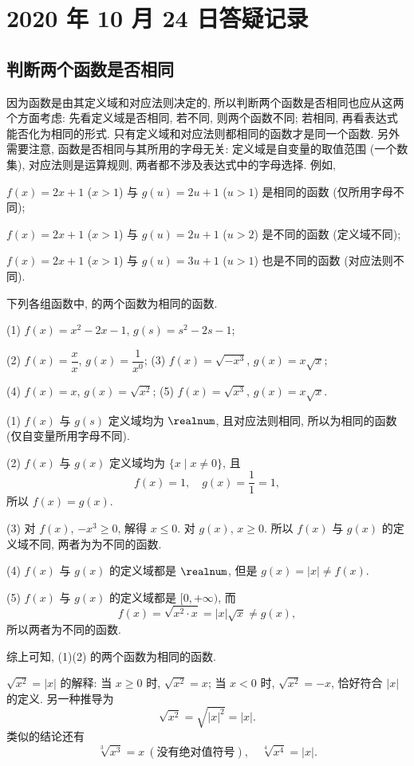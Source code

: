 \section{2020 年 10 月 24 日答疑记录}

\subsection{判断两个函数是否相同}

因为函数是由其定义域和对应法则决定的, 所以判断两个函数是否相同也应从这两个方面考虑: 先看定义域是否相同, 若不同, 则两个函数不同; 若相同, 再看表达式能否化为相同的形式. 只有定义域和对应法则都相同的函数才是同一个函数. 另外需要注意, 函数是否相同与其所用的字母无关: 定义域是自变量的取值范围 (一个数集), 对应法则是运算规则, 两者都不涉及表达式中的字母选择. 例如, 

$f(x)=2x+1$ ($x>1$) 与 $g(u)=2u+1$ ($u>1$) 是相同的函数 (仅所用字母不同); 

$f(x)=2x+1$ ($x>1$) 与 $g(u)=2u+1$ ($u>2$) 是不同的函数 (定义域不同);

 $f(x)=2x+1$ ($x>1$) 与 $g(u)=3u+1$ ($u>1$) 也是不同的函数  (对应法则不同).

\begin{example}
    下列各组函数中, \underline{\qquad} 的两个函数为相同的函数.
    
    (1) $f(x)= x^2-2x-1$, $g(s)=s^2-2s-1$;
    
    (2) $f(x)=\dfrac{x}x$, $g(x)=\dfrac1{x^0}$;\qquad
    (3) $f(x)=\sqrt{-x^3}$, $g(x)=x\sqrt{x}$;
    
    (4) $f(x)=x$, $g(x)=\sqrt{x^2}$;\qquad
    (5) $f(x)=\sqrt{x^3}$, $g(x)=x\sqrt{x}$.
\end{example}
\begin{solution}
    (1) $f(x)$ 与 $g(s)$ 定义域均为 $\realnum$, 且对应法则相同, 所以为相同的函数 (仅自变量所用字母不同).
    
    (2) $f(x)$ 与 $g(x)$ 定义域均为 $\{x\mid x\neq 0\}$, 且
    \[f(x)=1,\quad g(x)=\frac11=1,\]
    所以 $f(x)=g(x)$.
    
    (3) 对 $f(x)$, $-x^3\geqslant 0$, 解得 $x\leqslant 0$.
    对 $g(x)$, $x\geqslant 0$. 所以 $f(x)$ 与 $g(x)$ 的定义域不同, 两者为为不同的函数.
    
    (4) $f(x)$ 与 $g(x)$ 的定义域都是 $\realnum$, 但是 $g(x)=|x|\neq f(x)$.
    
    (5) $f(x)$ 与 $g(x)$ 的定义域都是 $[0,+\infty)$, 而
    \[f(x)=\sqrt{x^2\cdot x}=|x|\sqrt{x}\neq g(x),\]
    所以两者为不同的函数.
    
    综上可知, (1)(2) 的两个函数为相同的函数.
\end{solution}
\begin{remark}
    $\sqrt{x^2}=|x|$ 的解释: 当 $x\geqslant 0$ 时, $\sqrt{x^2}=x$; 当 $x< 0$ 时, $\sqrt{x^2}=-x$, 恰好符合 $|x|$ 的定义. 另一种推导为
    \[\sqrt{x^2}= \sqrt{|x|^2}= |x|.\]
    类似的结论还有
    \[\sqrt[3]{x^3}=x\ (\text{没有绝对值符号}),\quad
      \sqrt[4]{x^4}=|x|.\]
\end{remark}

